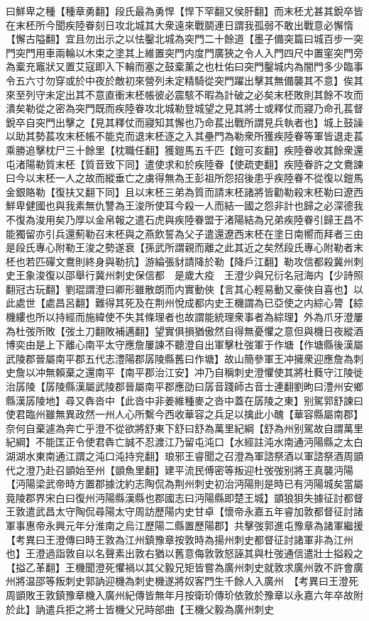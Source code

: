 曰鮮卑之種【種章勇翻】段氏最為勇悍【悍下罕翻又侯肝翻】而末柸尤甚其銳卒皆在末柸所今聞疾陸眷刻日攻北城其大衆遠來戰鬬連日謂我孤弱不敢出戰意必懈惰【懈古隘翻】宜且勿出示之以怯鑿北城為突門二十餘道【墨子備突篇曰城百步一突門突門用車兩輪以木束之塗其上維置突門内度門廣狹之令人入門四尺中置窐突門旁為槖充竈狀又置艾寇即入下輪而塞之鼓槖薰之也杜佑曰突門鑿城内為闇門多少臨事令五六寸勿穿或於中夜於敵初來營列未定精騎從突門躍出擊其無備襲其不意】俟其來至列守未定出其不意直衝末柸帳彼必震駭不暇為計破之必矣末柸敗則其餘不攻而潰矣勒從之密為突門既而疾陸眷攻北城勒登城望之見其將士或釋仗而寢乃命孔萇督銳卒自突門出擊之【見其釋仗而寢知其懈也乃命萇出戰所謂見兵執者也】城上鼓譟以助其勢萇攻末柸帳不能克而退末柸逐之入其壘門為勒衆所獲疾陸眷等軍皆退走萇乘勝追擊枕尸三十餘里【枕職任翻】獲鎧馬五千匹【鎧可亥翻】疾陸眷收其餘衆還屯渚陽勒質末柸【質音致下同】遣使求和於疾陸眷【使疏吏翻】疾陸眷許之文鴦諫曰今以末柸一人之故而縱垂亡之虜得無為王彭祖所怨招後患乎疾陸眷不從復以鎧馬金銀賂勒【復扶又翻下同】且以末柸三弟為質而請末柸諸將皆勸勒殺末柸勒曰遼西鮮卑健國也與我素無仇讐為王浚所使耳今殺一人而結一國之怨非計也歸之必深德我不復為浚用矣乃厚以金帛報之遣石虎與疾陸眷盟于渚陽結為兄弟疾陸眷引歸王昌不能獨留亦引兵還薊勒召末柸與之燕飲誓為父子遣還遼西末柸在塗日南嚮而拜者三由是段氏專心附勒王浚之勢遂衰【孫武所謂親而離之此其近之矣然段氏專心附勒者末柸也若匹磾文鴦則終身與勒抗】游綸張豺請降於勒【降戶江翻】勒攻信都殺冀州刺史王象浚復以邵舉行冀州刺史保信都　是歲大疫　王澄少與兄衍名冠海内【少詩照翻冠古玩翻】劉琨謂澄曰卿形雖散朗而内實動俠【言其心輕易動又豪俠自喜也】以此處世【處昌呂翻】難得其死及在荆州悅成都内史王機謂為已亞使之内綜心膂【綜機縷也所以持經而施緯使不失其條理者也故謂能統理衆事者為綜理】外為爪牙澄屢為杜弢所敗【弢土刀翻敗補邁翻】望實俱損猶傲然自得無憂懼之意但與機日夜縱酒博奕由是上下離心南平太守應詹屢諫不聽澄自出軍擊杜弢軍于作塘【作塘縣後漢屬武陵郡晉屬南平郡五代志澧陽郡孱陵縣舊曰作塘】故山簡參軍王冲擁衆迎應詹為刺史詹以冲無賴棄之還南平【南平郡治江安】冲乃自稱刺史澄懼使其將杜蕤守江陵徙治孱陵【孱陵縣漢屬武陵郡晉屬南平郡應劭曰孱音踐師古音士連翻劉昫曰澧州安鄉縣漢孱陵地】尋又犇沓中【此沓中非姜維種麥之沓中蓋在孱陵之東】别駕郭舒諫曰使君臨州雖無異政然一州人心所繫今西收華容之兵足以擒此小醜【華容縣屬南郡】奈何自棄遽為奔亡乎澄不從欲將舒東下舒曰舒為萬里紀綱【舒為州别駕故自謂萬里紀綱】不能匡正令使君犇亡誠不忍渡江乃留屯沌口【水經註沌水南通沔陽縣之太白湖湖水東南通江謂之沌口沌持兖翻】琅邪王睿聞之召澄為軍諮祭酒以軍諮祭酒周顗代之澄乃赴召顗始至州【顗魚里翻】建平流民傅密等叛迎杜弢弢别將王真襲沔陽【沔陽梁武帝時方置郡據沈約志陶侃為荆州刺史初治沔陽則是時已有沔陽城矣當屬竟陵郡界宋白曰復州沔陽縣漢縣也郡國志曰沔陽縣即楚王城】顗狼狽失據征討都督王敦遣武昌太守陶侃尋陽太守周訪歷陽内史甘卓【懷帝永嘉五年睿加敦都督征討諸軍事惠帝永興元年分淮南之烏江歷陽二縣置歷陽郡】共擊弢郭進屯豫章為諸軍繼援　【考異曰王澄傳曰時王敦為江州鎮豫章按敦時為揚州刺史都督征討諸軍非為江州也】王澄過詣敦自以名聲素出敦右猶以舊意侮敦敦怒誣其與杜弢通信遣壯士搤殺之【搤乙革翻】王機聞澄死懼禍以其父毅兄矩皆嘗為廣州刺史就敦求廣州敦不許會廣州將温邵等叛刺史郭訥迎機為刺史機遂將奴客門生千餘人入廣州　【考異曰王澄死周顗敗王敦鎮豫章機入廣州紀傳皆無年月按衛玠傳玠依敦於豫章以永嘉六年卒故附於此】訥遣兵拒之將士皆機父兄時部曲【王機父毅為廣州刺史